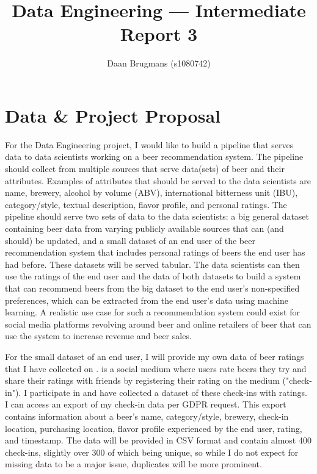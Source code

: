 \documentclass[sigconf, natbib=true]{acmart}
\begin{document}
\title{Data Engineering --- Intermediate Report 3}

\author{Daan Brugmans (s1080742)}

\maketitle

\section{Data \& Project Proposal}
For the Data Engineering project, I would like to build a pipeline that serves data to data scientists working on a beer recommendation system.
The pipeline should collect from multiple sources that serve data(sets) of beer and their attributes.
Examples of attributes that should be served to the data scientists are name, brewery, alcohol by volume (ABV), international bitterness unit (IBU), category/style, textual description, flavor profile, and personal ratings.
The pipeline should serve two sets of data to the data scientists: a big general dataset containing beer data from varying publicly available sources that can (and should) be updated, and a small dataset of an end user of the beer recommendation system that includes personal ratings of beers the end user has had before.
These datasets will be served tabular.
The data scientists can then use the ratings of the end user and the data of both datasets to build a system that can recommend beers from the big dataset to the end user's non-specified preferences, which can be extracted from the end user's data using machine learning.
A realistic use case for such a recommendation system could exist for social media platforms revolving around beer and online retailers of beer that can use the system to increase revenue and beer sales.

For the small dataset of an end user, I will provide my own data of beer ratings that I have collected on \citeauthor{untappd}.
\citet{untappd} is a social medium where users rate beers they try and share their ratings with friends by registering their rating on the medium ("check-in").
I participate in \citeauthor{untappd} and have collected a dataset of these check-ins with ratings.
I can access an export of my check-in data per GDPR request.
This export contains information about a beer's name, category/style, brewery, check-in location, purchasing location, flavor profile experienced by the end user, rating, and timestamp.
The data will be provided in CSV format and contain almost 400 check-ins, slightly over 300 of which being unique, so while I do not expect for missing data to be a major issue, duplicates will be more prominent.
\end{document}
